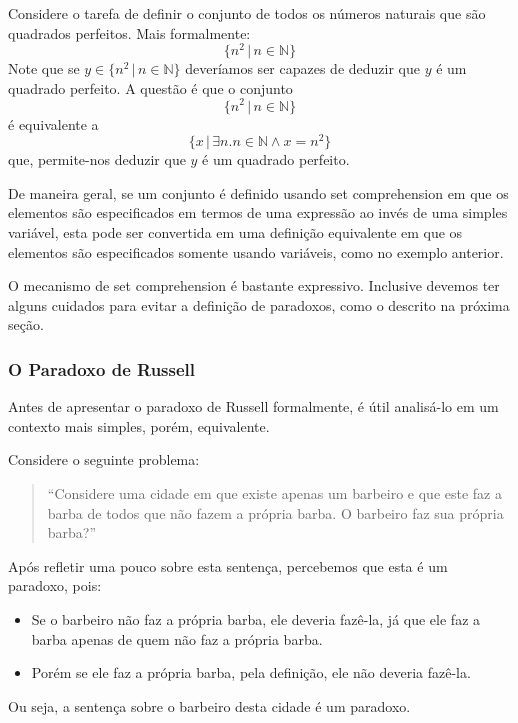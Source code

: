 \begin{Example}
Considere o tarefa de definir o conjunto de todos os números naturais
que são quadrados perfeitos. Mais formalmente:
\[\{n^2\,|\,n\in\mathbb{N}\}\]
Note que se $y\in \{n^2\,|\,n\in\mathbb{N}\}$ deveríamos ser capazes
de deduzir que $y$ é um quadrado perfeito. A questão é que o conjunto
\[\{n^2\,|\,n\in\mathbb{N}\}\]
é equivalente a
\[\{x\,|\,\exists n. n\in\mathbb{N} \land x = n^2\}\]
que, permite-nos deduzir que $y$ é um quadrado perfeito.
\end{Example}

De maneira geral, se um conjunto é definido usando set comprehension
em que os elementos são especificados em termos de uma expressão ao
invés de uma simples variável, esta pode ser convertida em uma
definição equivalente em que os elementos são especificados somente
usando variáveis, como no exemplo anterior.

O mecanismo de set comprehension é bastante expressivo. Inclusive
devemos ter alguns cuidados para evitar a definição de paradoxos, como
o descrito na próxima seção.


\subsubsection{O Paradoxo de Russell}

Antes de apresentar o paradoxo de Russell formalmente, é útil
analisá-lo em um contexto mais simples, porém, equivalente.

\begin{Example}
Considere o seguinte problema:

\begin{quote}
``Considere uma cidade em que existe apenas um barbeiro e que este faz a
barba de todos que não fazem a própria barba. O barbeiro faz sua
própria barba?''
\end{quote}

Após refletir uma pouco sobre esta sentença, percebemos que esta é um
paradoxo, pois:
\begin{itemize}
  \item Se o barbeiro não faz a própria barba, ele deveria fazê-la, já
    que ele faz a barba apenas de quem não faz a própria barba.
  \item Porém se ele faz a própria barba, pela definição, ele não
    deveria fazê-la.
\end{itemize}

Ou seja, a sentença sobre o barbeiro desta cidade é um paradoxo.
\end{Example}

